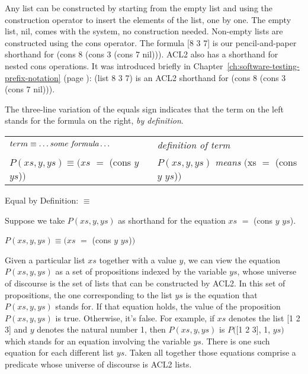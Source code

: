 Any list can be constructed by starting from the empty list
and using the construction operator to insert the elements of the list, one by one.
The empty list, nil, comes with the system, no construction needed.
Non-empty lists are constructed using the cons operator.
The formula [8 3 7] is our pencil-and-paper shorthand for (cons 8 (cons 3 (cons 7 nil))).
ACL2 also has a shorthand for nested cons operations.
It was introduced briefly in
Chapter~\ref{ch:software-testing-prefix-notation} (page \pageref{list-op-informal}):
(list 8 3 7) is an ACL2 shorthand for (cons 8 (cons 3 (cons 7 nil))).

\begin{aside}
The three-line variation of the equals sign
indicates that the term on the left stands
for the formula on the right, \emph{by definition}.
\begin{center}
\begin{tabular}{ll}
$term \equiv \dots \emph{some formula} \dots$    &\emph{definition of term} \\
$P(xs, y, ys) \equiv (xs$ $=$ (cons $y$ $ys$)$)$ &$P(xs, y, ys)$ \emph{means} $($xs $=$ (cons $y$ $ys$)$)$  \\
\end{tabular}
\end{center}
\caption{Equal by Definition: $\equiv$}
\label{three-line-equal}
\end{aside}

Suppose we take $P(xs, y, ys)$ as shorthand
for the equation $xs$ $=$ (cons $y$ $ys$).
\begin{center}
$P(xs, y, ys) \equiv (xs$ $=$ (cons $y$ $ys$)$)$
\end{center}

Given a particular list $xs$ together with a value $y$,
we can view the equation $P(xs, y, ys)$ as a set of propositions
indexed by the variable $ys$, whose universe of discourse is the set of
lists that can be constructed by ACL2.
In this set of propositions, the one corresponding to
the list $ys$ is the equation that $P(xs, y, ys)$ stands for.
If that equation holds, the value of the proposition $P(xs, y, ys)$ is true.
Otherwise, it's false.
For example, if $xs$ denotes the list [1 2 3]
and $y$ denotes the natural number 1,
then $P(xs, y, ys)$ is $P($[1 2 3], 1, $ys)$
which stands for an equation involving the variable $ys$.
There is one such equation for each different list $ys$.
Taken all together those equations comprise a predicate
whose universe of discourse is ACL2 lists.

